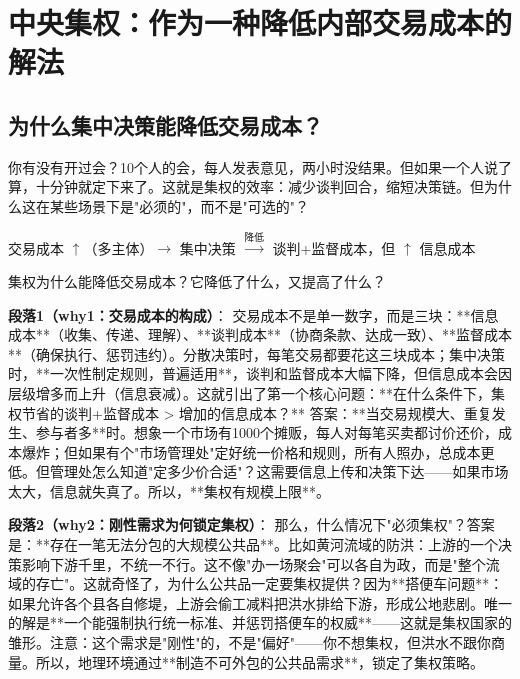 \documentclass[openany, a4paper, 12pt]{book}
\newenvironment{logicmap}{
	\begin{tcolorbox}[
		colback=blue!5!white,      %
		colframe=blue!50!black,    %
		title=\textbf{逻辑地图 (Logic Map)}, %
		fonttitle=\bfseries,
		sharp corners=south,       %
		boxrule=0.5mm
		]
	\centering
	}{
	\end{tcolorbox}
}
\newenvironment{motivation}{
	\vspace{0.5em}
	\begin{tcolorbox}[
		colback=gray!10,           %
		colframe=gray!60,          %
		title=\textit{本章动机 (Motivation)},
		fonttitle=\bfseries,
		arc=0mm,                   %
		leftrule=3mm               %
		]
		\small \itshape %
	}{
	\end{tcolorbox}
	\vspace{1em}
}
\begin{document}
	\section{中央集权：作为一种降低内部交易成本的解法}
	
	\subsection{为什么集中决策能降低交易成本？}
	
	\begin{motivation}
		你有没有开过会？10个人的会，每人发表意见，两小时没结果。但如果一个人说了算，十分钟就定下来了。这就是集权的效率：减少谈判回合，缩短决策链。但为什么这在某些场景下是"必须的"，而不是"可选的"？
	\end{motivation}
	
	\begin{logicmap}
		交易成本 $\uparrow$（多主体）$\rightarrow$ 集中决策 $\xrightarrow{\text{降低}}$ 谈判+监督成本，但 $\uparrow$ 信息成本
	\end{logicmap}
	
	\begin{questionbox}
		集权为什么能降低交易成本？它降低了什么，又提高了什么？
	\end{questionbox}
	
	\textbf{段落1（why1：交易成本的构成）}：  
	交易成本不是单一数字，而是三块：**信息成本**（收集、传递、理解）、**谈判成本**（协商条款、达成一致）、**监督成本**（确保执行、惩罚违约）。分散决策时，每笔交易都要花这三块成本；集中决策时，**一次性制定规则，普遍适用**，谈判和监督成本大幅下降，但信息成本会因层级增多而上升（信息衰减）。这就引出了第一个核心问题：**在什么条件下，集权节省的谈判+监督成本 > 增加的信息成本？** 答案：**当交易规模大、重复发生、参与者多**时。想象一个市场有1000个摊贩，每人对每笔买卖都讨价还价，成本爆炸；但如果有个"市场管理处"定好统一价格和规则，所有人照办，总成本更低。但管理处怎么知道"定多少价合适"？这需要信息上传和决策下达——如果市场太大，信息就失真了。所以，**集权有规模上限**。
	
	\textbf{段落2（why2：刚性需求为何锁定集权）}：  
	那么，什么情况下"必须集权"？答案是：**存在一笔无法分包的大规模公共品**。比如黄河流域的防洪：上游的一个决策影响下游千里，不统一不行。这不像"办一场聚会"可以各自为政，而是"整个流域的存亡"。这就奇怪了，为什么公共品一定要集权提供？因为**搭便车问题**：如果允许各个县各自修堤，上游会偷工减料把洪水排给下游，形成公地悲剧。唯一的解是**一个能强制执行统一标准、并惩罚搭便车的权威**——这就是集权国家的雏形。注意：这个需求是"刚性"的，不是"偏好"——你不想集权，但洪水不跟你商量。所以，地理环境通过**制造不可外包的公共品需求**，锁定了集权策略。
	
\end{document}
